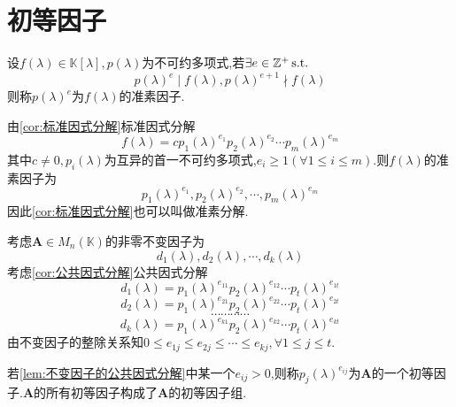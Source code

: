 \section{初等因子}
\begin{formal}
\begin{definition}[准素因子]\label{def:准素因子}
    设$f\left(\lambda\right)\in\mathbb{K}\left[\lambda\right],p\left(\lambda\right)$为不可约多项式,若$\exists e\in \mathbb{Z}^+\,\textup{s.t.}$\[
    p\left(\lambda\right)^e\mid f\left(\lambda\right),p\left(\lambda\right)^{e+1}\nmid f\left(\lambda\right)
    \]则称$p\left(
        \lambda
    \right)^e$为$f\left(\lambda\right)$的准素因子.
\end{definition}
\end{formal}
\begin{brown}
\begin{example}
    由\cref{cor:标准因式分解}标准因式分解\[
     f\left(\lambda\right)=cp_1\left(\lambda\right)^{e_1}p_2\left(\lambda\right)^{e_2}\cdots p_m\left(\lambda\right)^{e_m}
    \]其中$c\neq 0,p_i\left(\lambda\right)$为互异的首一不可约多项式,$e_i\geqslant 1\left(
        \forall 1\leqslant i\leqslant m 
    \right)$.则$f\left(\lambda\right)$的准素因子为
    \[
    p_1\left(\lambda\right)^{e_1},p_2\left(\lambda\right)^{e_2},\cdots,p_m\left(\lambda\right)^{e_m}
    \]因此\cref{cor:标准因式分解}也可以叫做准素分解.
\end{example}
\end{brown}
\begin{green}
\begin{lemma}[不变因子的公共因式分解]\label{lem:不变因子的公共因式分解}
    考虑$\bm{A}\in M_n\left(\mathbb{K}\right)$的非零不变因子为\[d_1\left(\lambda\right),d_2\left(\lambda\right),\cdots,d_k\left(\lambda\right)\]
    考虑\cref{cor:公共因式分解}公共因式分解
    \[
    d_1\left(\lambda\right)=p_1\left(\lambda\right)^{e_{11}}p_2\left(\lambda\right)^{e_{12}}\cdots p_t\left(\lambda\right)^{e_{1t}}
    \]\[
    d_2\left(\lambda\right)=p_1\left(\lambda\right)^{e_{21}}p_2\left(\lambda\right)^{e_{22}}\cdots p_t\left(\lambda\right)^{e_{2t}}
    \]
    \[
    \cdots\cdots\cdots\cdots
    \]
    \[
    d_k\left(\lambda\right)=p_1\left(\lambda\right)^{e_{k1}}p_2\left(\lambda\right)^{e_{k2}}\cdots p_t\left(\lambda\right)^{e_{kt}}
    \]由不变因子的整除关系知$0\leqslant e_{1j}\leqslant e_{2j}\leqslant \cdots\leqslant e_{kj},\forall 1\leqslant j\leqslant t.$
\end{lemma}
\end{green}
\begin{formal}
\begin{definition}[初等因子]\label{def:初等因子}
    若\cref{lem:不变因子的公共因式分解}中某一个$e_{ij}>0$,则称$p_{j}\left(\lambda\right)^{e_{ij}}$为$\bm{A}$的一个初等因子.$\bm{A}$的所有初等因子构成了$\bm{A}$的初等因子组.
\end{definition}
\end{formal}
